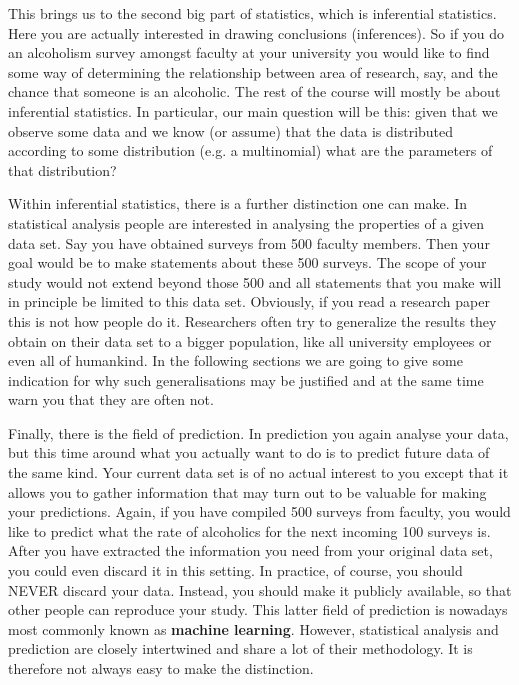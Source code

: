 This brings us to the second big part of statistics, which is inferential statistics. Here you are actually interested in drawing
conclusions (inferences). So if you do an alcoholism survey amongst faculty at your university you would like to find some
way of determining the relationship between area of research, say, and the chance that someone is an alcoholic. The rest of the
course will mostly be about inferential statistics. In particular, our main question will be this: given that we observe some data and
we know (or assume) that the data is distributed according to some distribution (e.g. a multinomial) what are the parameters
of that distribution?

Within inferential statistics, there is a further distinction one can make. In statistical analysis people are interested in analysing
the properties of a given data set. Say you have obtained surveys from 500 faculty members. Then your goal would be to make
statements about these 500 surveys. The scope of your study would not extend beyond those 500 and all statements that you make
will in principle be limited to this data set. Obviously, if you read a research paper this is not how people do it. Researchers
often try to generalize the results they obtain on their data set to a bigger population, like all university employees or even
all of humankind. In the following sections we are going to give some indication for why such generalisations may be justified and
at the same time warn you that they are often not.

Finally, there is the field of prediction. In prediction you again analyse your data, but this time around what you actually want to
do is to predict future data of the same kind. Your current data set is of no actual interest to you except that it allows you
to gather information that may turn out to be valuable for making your predictions. Again, if you have compiled 500 surveys from 
faculty, you would like to predict what the rate of alcoholics for the next incoming 100 surveys is. After you have extracted
the information you need from your original data set, you could even discard it in this setting. In practice, of course, you 
should NEVER discard your data. Instead, you should make it publicly available, so that other people can reproduce your study.
This latter field of prediction is nowadays most commonly known as \textbf{machine learning}. However, statistical analysis and 
prediction are closely intertwined and share a lot of their methodology. It is therefore not always easy to make the distinction.



